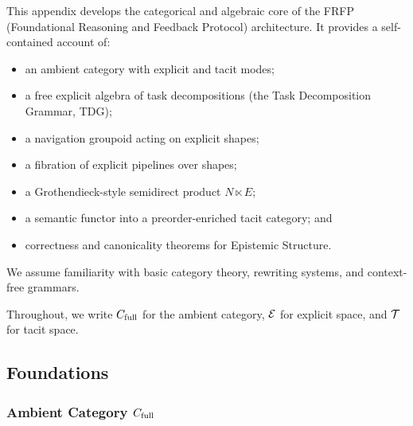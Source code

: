 
This appendix develops the categorical and algebraic core of the
FRFP (Foundational Reasoning and Feedback Protocol) architecture.
It provides a self-contained account of:

\begin{itemize}
  \item an ambient category with explicit and tacit modes;
  \item a free explicit algebra of task decompositions (the Task Decomposition Grammar, TDG);
  \item a navigation groupoid acting on explicit shapes;
  \item a fibration of explicit pipelines over shapes;
  \item a Grothendieck-style semidirect product \(N \ltimes E\);
  \item a semantic functor into a preorder-enriched tacit category; and
  \item correctness and canonicality theorems for Epistemic Structure.
\end{itemize}

We assume familiarity with basic category theory, rewriting systems,
and context-free grammars.

Throughout, we write \(C_{\mathrm{full}}\) for the ambient category,
\(\mathcal{E}\) for explicit space, and \(\mathcal{T}\) for tacit space.

\subsection{Foundations}

\subsubsection{Ambient Category \texorpdfstring{\(C_{\mathrm{full}}\)}{Cfull}}

